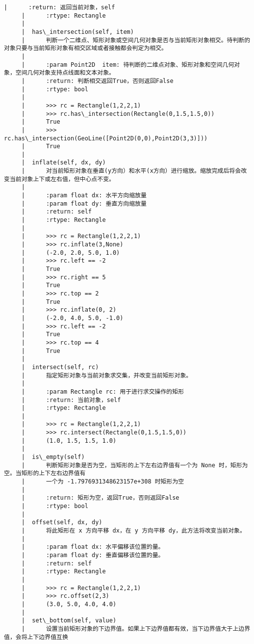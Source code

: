 \documentclass[11pt]{article}
\begin{document}
\begin{Verbatim}[commandchars=\\\{\}]
     |      :return: 返回当前对象，self
     |      :rtype: Rectangle
     |  
     |  has\_intersection(self, item)
     |      判断一个二维点、矩形对象或空间几何对象是否与当前矩形对象相交。待判断的对象只要与当前矩形对象有相交区域或者接触都会判定为相交。
     |      
     |      :param Point2D  item: 待判断的二维点对象、矩形对象和空间几何对象，空间几何对象支持点线面和文本对象。
     |      :return: 判断相交返回True，否则返回False
     |      :rtype: bool
     |      
     |      >>> rc = Rectangle(1,2,2,1)
     |      >>> rc.has\_intersection(Rectangle(0,1.5,1.5,0))
     |      True
     |      >>> rc.has\_intersection(GeoLine([Point2D(0,0),Point2D(3,3)]))
     |      True
     |  
     |  inflate(self, dx, dy)
     |      对当前矩形对象在垂直(y方向）和水平(x方向）进行缩放。缩放完成后将会改变当前对象上下或左右值，但中心点不变。
     |      
     |      :param float dx: 水平方向缩放量
     |      :param float dy: 垂直方向缩放量
     |      :return: self
     |      :rtype: Rectangle
     |      
     |      >>> rc = Rectangle(1,2,2,1)
     |      >>> rc.inflate(3,None)
     |      (-2.0, 2.0, 5.0, 1.0)
     |      >>> rc.left == -2
     |      True
     |      >>> rc.right == 5
     |      True
     |      >>> rc.top == 2
     |      True
     |      >>> rc.inflate(0, 2)
     |      (-2.0, 4.0, 5.0, -1.0)
     |      >>> rc.left == -2
     |      True
     |      >>> rc.top == 4
     |      True
     |  
     |  intersect(self, rc)
     |      指定矩形对象与当前对象求交集，并改变当前矩形对象。
     |      
     |      :param Rectangle rc: 用于进行求交操作的矩形
     |      :return: 当前对象，self
     |      :rtype: Rectangle
     |      
     |      >>> rc = Rectangle(1,2,2,1)
     |      >>> rc.intersect(Rectangle(0,1.5,1.5,0))
     |      (1.0, 1.5, 1.5, 1.0)
     |  
     |  is\_empty(self)
     |      判断矩形对象是否为空，当矩形的上下左右边界值有一个为 None 时，矩形为空。当矩形的上下左右边界值有
     |      一个为 -1.7976931348623157e+308 时矩形为空
     |      
     |      :return: 矩形为空，返回True，否则返回False
     |      :rtype: bool
     |  
     |  offset(self, dx, dy)
     |      将此矩形在 x 方向平移 dx，在 y 方向平移 dy，此方法将改变当前对象。
     |      
     |      :param float dx: 水平偏移该位置的量。
     |      :param float dy: 垂直偏移该位置的量。
     |      :return: self
     |      :rtype: Rectangle
     |      
     |      >>> rc = Rectangle(1,2,2,1)
     |      >>> rc.offset(2,3)
     |      (3.0, 5.0, 4.0, 4.0)
     |  
     |  set\_bottom(self, value)
     |      设置当前矩形对象的下边界值。如果上下边界值都有效，当下边界值大于上边界值，会将上下边界值互换

\end{Verbatim}
\end{document}
